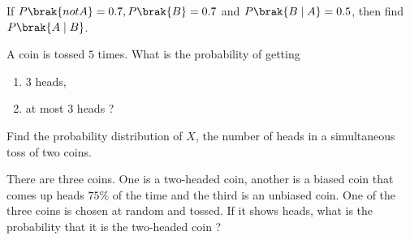 \item If $P\brak{not A} =0.7, P\brak{B}=0.7$ and $P\brak{B\mid A}=0.5$, then find $P\brak{A\mid B}$.
\item A coin is tossed $5$ times. What is the probability of getting 
	\begin{enumerate}[label=(\roman*)]
		\item $3$ heads,
		\item at most $3$ heads ?
	\end{enumerate}	
 \item Find the probability distribution of $X$, the number of heads in a simultaneous toss of two coins.
\item There are three coins. One is a two-headed coin, another is a biased coin that comes up heads $75 \%$ of the time and the third is an unbiased coin. One of the three coins is chosen at random and tossed. If it shows heads, what is the probability that it is the two-headed coin ?

